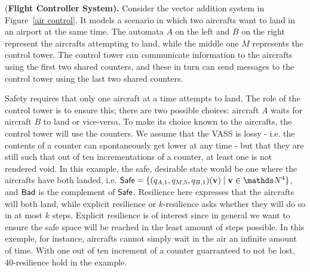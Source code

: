 \begin{example}\label{Example}
{(\bf Flight Controller System).}
Consider the vector addition system in Figure~\ref{air control}. It models a scenario in which two aircrafts want to land in an airport at the same time. 
The automata $A$ on the left and $B$ on the right represent the aircrafts attempting to land, while the middle one $M$ represents the control tower. The control tower can communicate information to the aircrafts using 
the first two shared counters, and these in turn can send messages to the control tower
using the last two shared counters. 

Safety requires that only one aircraft at a time attempts to land. The role of the control tower is to ensure this;
there are two possible choices: aircraft $A$ waits for aircraft $B$ to land
or vice-versa. To make its choice known to the aircrafts, the control tower will use the counters. 
We assume that the VASS is
lossy \-- i.e. 
 the contents of a counter can spontaneously get lower at any time
 \--  but that they are still such that out of ten incrementations of a counter, at least one is not rendered void.
In this example, the safe, desirable state would be one where the aircrafts have both landed, i.e.
$\Safe = \{(q_{A,1}, q_{M,5}, q_{B,1})(\textbf{v}) \mid \textbf{v} \in \N^4\}$, and $\textsf{Bad}$ is the complement of $\textsf{Safe}$. 
Resilience here expresses that the aircrafts will both land, while explicit resilience or $k$-resilience asks whether they will do so in at most $k$ steps. 
Explicit resilience is of interest since in general we want to ensure the safe space will
be reached in
the least amount of steps possible. 
In this exemple, for instance, aircrafts cannot simply wait in the air an infinite amount of time.
With one out of ten increment of a counter guarranteed to not be lost, $40$-resilience hold in the example.
\end{example}





